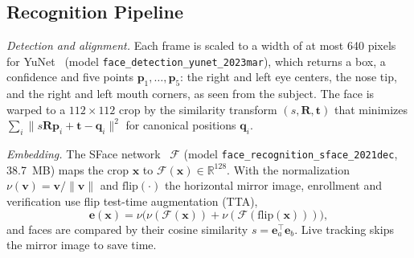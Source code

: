 \documentclass{ieeeaccess}
\begin{document}
\subsection{Recognition Pipeline}\label{sec:recog}
\emph{Detection and alignment.} Each frame is scaled to a width of at most 640 pixels for YuNet~\cite{wu2023yunet} (model \texttt{face\_\allowbreak{}detection\_\allowbreak{}yunet\_\allowbreak{}2023mar}), which returns a box, a confidence and five points $\mathbf{p}_1,\dots,\mathbf{p}_5$: the right and left eye centers, the nose tip, and the right and left mouth corners, as seen from the subject. The face is warped to a $112\times112$ crop by the similarity transform $(s,\mathbf{R},\mathbf{t})$ that minimizes $\sum_i \lVert s\mathbf{R}\mathbf{p}_i+\mathbf{t}-\mathbf{q}_i\rVert^2$ for canonical positions $\mathbf{q}_i$.

\emph{Embedding.} The SFace network~\cite{zhong2021sface} $\mathcal{F}$ (model \texttt{face\_\allowbreak{}recognition\_\allowbreak{}sface\_\allowbreak{}2021dec}, 38.7~MB) maps the crop $\mathbf{x}$ to $\mathcal{F}(\mathbf{x})\in\mathbb{R}^{128}$. With the normalization $\nu(\mathbf{v})=\mathbf{v}/\lVert\mathbf{v}\rVert$ and $\mathrm{flip}(\cdot)$ the horizontal mirror image, enrollment and verification use flip test-time augmentation (TTA),
\begin{equation}
\mathbf{e}(\mathbf{x}) = \nu\bigl(\nu(\mathcal{F}(\mathbf{x}))+\nu(\mathcal{F}(\mathrm{flip}(\mathbf{x})))\bigr),
\end{equation}
and faces are compared by their cosine similarity $s=\mathbf{e}_a^\top\mathbf{e}_b$. Live tracking skips the mirror image to save time.
\end{document}
